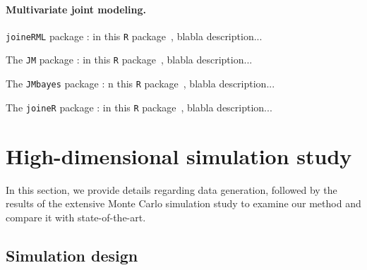 \documentclass[11pt]{article}
\begin{document}
\paragraph*{Multivariate joint modeling.}

\texttt{joineRML} package : in this \texttt{R} package~\citep{hickey2018joinerml}, blabla description...

The \texttt{JM} package : in this \texttt{R} package~\citep{rizopoulos2010jm}, blabla description...

The \texttt{JMbayes} package : n this \texttt{R} package~\citep{rizopoulos2014r}, blabla description...


The \texttt{joineR} package : in this \texttt{R} package~\citep{philipson2018package}, blabla description...


\section{High-dimensional simulation study}
\label{sec:simulation study}

In this section, we provide details regarding data generation, followed by the results of the extensive Monte Carlo simulation study to examine our method and compare it with state-of-the-art.

\subsection{Simulation design}
\label{simulation design}
\end{document}
